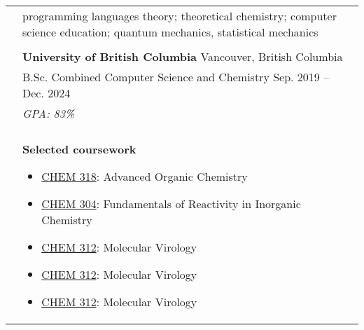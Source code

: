 \documentclass[letterpaper, 11pt]{article}
\begin{document}

\vspace{0.5cm} 


\setlength{\tabcolsep}{8pt}

\begin{longtable}{p{1.3in}p{4.8in}}

\nohyphens{\color{Blue}{Research Interests}}
& programming languages theory; theoretical chemistry; computer science education; quantum mechanics, statistical mechanics \\
& \\

\color{Blue}{Education} 
& \textbf{University of British Columbia} \hfill Vancouver, British Columbia \\
& B.Sc. Combined Computer Science and Chemistry \hfill Sep. 2019 -- Dec. 2024 \\
& {\it GPA: 83\%} \\
& \\

& \textbf{Selected coursework}
\begin{itemize}[noitemsep,leftmargin=*]
\item \underline{CHEM 318}: Advanced Organic Chemistry
\item \underline{CHEM 304}: Fundamentals of Reactivity in Inorganic Chemistry
\item \underline{CHEM 312}: Molecular Virology
\item \underline{CHEM 312}: Molecular Virology
\item \underline{CHEM 312}: Molecular Virology
\end{itemize} \\



\end{longtable}
\end{document}
